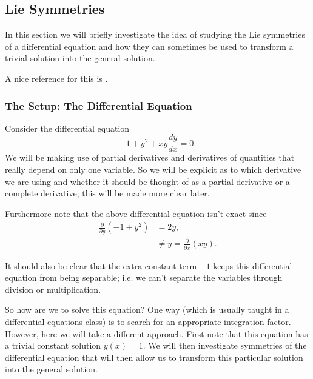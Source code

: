 \subsection{Lie Symmetries}

\newcommand{\phiX}{\phi_{\tilde x}}
\newcommand{\phiY}{\phi_{\tilde y}}
\newcommand{\phiZ}{\phi_{\tilde z}}
\newcommand{\VX}{V_x}
\newcommand{\VY}{V_y}
\newcommand{\VZ}{V_z}

In this section we will briefly investigate the idea of studying the Lie symmetries of a differential equation
and how they can sometimes be used to transform a trivial solution into the general solution.

A nice reference for this is \cite{lieGroups}.

\subsubsection*{The Setup: The Differential Equation}

Consider the differential equation
\begin{equation}
-1 + y^2 + xy \frac{dy}{dx} = 0.
\end{equation}
We will be making use of partial derivatives and derivatives of quantities that really depend on only
one variable. So we will be explicit as to which derivative we are using and whether it should
be thought of as a partial derivative or a complete derivative; this will be made more clear later.

Furthermore note that the above differential equation isn't exact since
\begin{align}
\frac{\partial}{\partial y} \left(-1 + y^2\right) & = 2y , \\
    & \neq y = \frac{\partial}{\partial x} \left(xy\right). 
\end{align}

It should also be clear that the extra constant term \(-1\) keeps this differential equation from being
separable; i.e. we can't separate the variables through division or multiplication.

So how are we to solve this equation? One way (which is usually taught in a differential equations class) is
to search for an appropriate integration factor. However, here we will take a different approach. First note
that this equation has a trivial constant solution \(y(x) = 1\). We will then investigate symmetries of the
differential equation that will then allow us to transform this particular solution into the general solution. 


